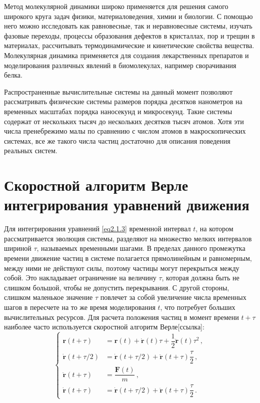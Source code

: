 \par Метод молекулярной динамики широко применяется для решения самого широкого круга задач физики, материаловедения, химии и биологии. С помощью него можно исследовать как равновесные, так и неравновесные системы, изучать фазовые переходы, процессы образования дефектов в кристаллах, пор и трещин в материалах, рассчитывать термодинамические и кинетические свойства вещества. Молекулярная динамика применяется для создания лекарственных препаратов и моделирования различных явлений в биомолекулах, например сворачивания белка.

\par Распространенные вычислительные системы на данный момент позволяют рассматривать физические системы размеров порядка десятков нанометров на временных масштабах порядка наносекунд и микросекунд. Такие системы содержат от нескольких тысяч до нескольких десятков тысяч атомов. Хотя эти числа пренебрежимо малы по сравнению с числом атомов в макроскопических системах, все же такого числа частиц достаточно для описания поведения реальных систем.

\section{Скоростной алгоритм Верле интегрирования уравнений движения}

Для интегрирования уравнений \eqref{eq2.1.3} временной интервал $t$, на котором рассматривается эволюция системы, разделяют на множество мелких интервалов шириной $\tau$, называемых временными шагами. В пределах данного промежутка времени движение частиц в системе полагается прямолинейным и равномерным, между ними не действуют силы, поэтому частицы могут перекрыться между собой. Это накладывает ограничение на величину $\tau$, которая должна быть не слишком большой, чтобы не допустить перекрывания. С другой стороны, слишком маленькое значение $\tau$ повлечет за собой увеличение числа временных шагов в пересчете на то же время моделирования $t$, что потребует больших вычислительных ресурсов. Для расчета положения частиц в момент времени $t+\tau$ наиболее часто используется скоростной алгоритм Верле[ссылка]:
\begin{equation}
    \begin{cases}
        \mathbf{r}(t+\tau) &= \mathbf{r}(t) + \mathbf{\dot{r}}(t)\tau+\dfrac{1}{2}\mathbf{\ddot{r}}(t)\tau^2\,, \\
        \mathbf{\dot{r}}(t+\tau/2) &= \mathbf{\dot{r}}(t+\tau/2)+\mathbf{\ddot{r}}(t+\tau)\dfrac{\tau}{2}\,, \\
        \mathbf{\ddot{r}}(t+\tau) &= \dfrac{\mathbf{F}(t)}{m}\,, \\
        \mathbf{\dot{r}}(t+\tau) &= \mathbf{\dot{r}}(t+\tau/2) + \mathbf{\ddot{r}}(t+\tau)\dfrac{\tau}{2}\,.
    \end{cases}
    \label{eq2.2.1}
\end{equation}

